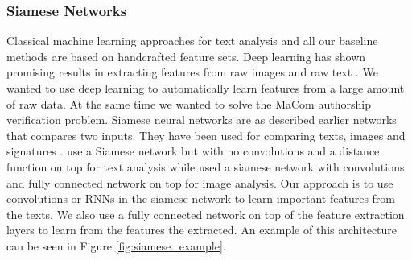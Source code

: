 \subsubsection{Siamese Networks}\label{subsubsec:siamese_networks}

Classical machine learning approaches for text analysis and all our
baseline methods are based on handcrafted feature sets. Deep learning
has shown promising results in extracting features from raw images and
raw text \citep{hongxiaosunyuan}. We wanted to use deep learning to
automatically learn features from a large amount of raw data. At the
same time we wanted to solve the MaCom authorship verification problem.
Siamese neural networks are as described earlier networks that compares
two inputs. They have been used for comparing texts, images and signatures
\citep{Koch2015SiameseNN,NIPS1993_769,qian:2018}. \citet{qian:2018} use a
Siamese network but with no convolutions and a distance function on top for
text analysis while \citet{Koch2015SiameseNN} used a siamese network with
convolutions and fully connected network on top for image analysis. Our approach
is to use convolutions or \gls{RNN}s in the siamese network to learn important
features from the texts. We also use a fully connected network on top of the
feature extraction layers to learn from the features the extracted. An example
of this architecture can be seen in Figure \ref{fig:siamese_example}.

